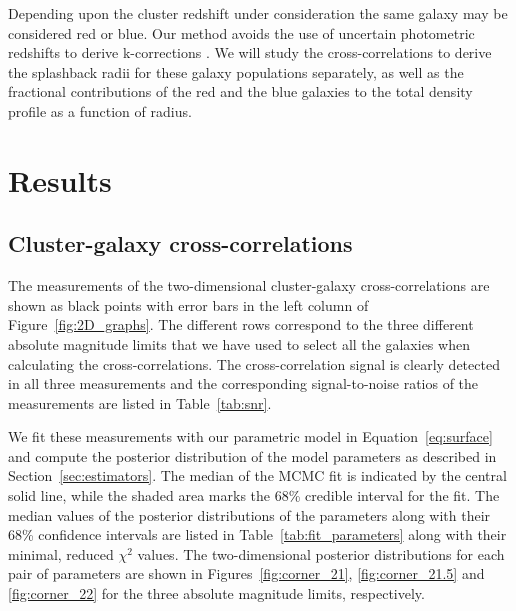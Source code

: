 \documentclass[iop, apjl, twocolappendix, numberedappendix]{emulateapj}
\begin{document}
Depending upon the cluster redshift
under consideration the same galaxy may be considered red or blue. Our
method avoids the use of uncertain photometric redshifts to derive
k-corrections \citep[cf.][]{baxter2017halo}. We will study the
cross-correlations to derive the splashback radii for these galaxy
populations separately, as well as the fractional
contributions of the red and the blue galaxies to the total density profile
as a function of radius.


\section{Results}
\label{sec:Results}
\subsection{Cluster-galaxy cross-correlations}
The measurements of the two-dimensional cluster-galaxy
cross-correlations are shown as black points with error bars in the
left column of Figure~\ref{fig:2D_graphs}. The different rows
correspond to the three different absolute magnitude limits that we
have used to select all the galaxies when calculating the
cross-correlations. The cross-correlation signal is clearly detected
in all three measurements and the corresponding signal-to-noise
ratios of the measurements are listed in Table~\ref{tab:snr}.

We fit these measurements with our parametric model in Equation~\ref{eq:surface}
and compute the posterior distribution of the model parameters 
as described in Section~\ref{sec:estimators}. The
median of the MCMC fit is indicated by the central solid line, while
the shaded area marks the 68\% credible interval for the fit. The
median values of the posterior distributions of the parameters along
with their 68\% confidence intervals are listed in
Table~\ref{tab:fit_parameters} along with their minimal, reduced
$\chi^2$ values. The two-dimensional posterior distributions for
each pair of parameters are shown in Figures~\ref{fig:corner_21},
\ref{fig:corner_21.5} and \ref{fig:corner_22} for the three absolute
magnitude limits, respectively.
\end{document}
